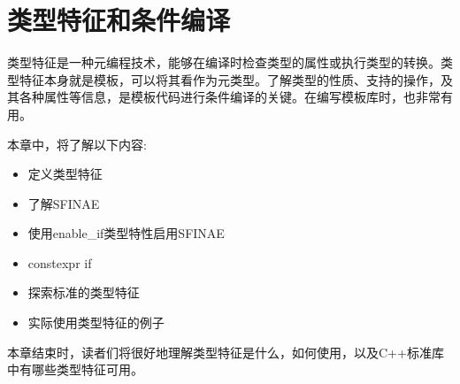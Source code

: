\chapter{类型特征和条件编译}
类型特征是一种元编程技术，能够在编译时检查类型的属性或执行类型的转换。类型特征本身就是模板，可以将其看作为元类型。了解类型的性质、支持的操作，及其各种属性等信息，是模板代码进行条件编译的关键。在编写模板库时，也非常有用。

本章中，将了解以下内容:

\begin{itemize}
  \item 定义类型特征
  \item 了解SFINAE
  \item 使用enable\_if类型特性启用SFINAE
  \item constexpr if
  \item 探索标准的类型特征
  \item 实际使用类型特征的例子
\end{itemize}

本章结束时，读者们将很好地理解类型特征是什么，如何使用，以及C++标准库中有哪些类型特征可用。









